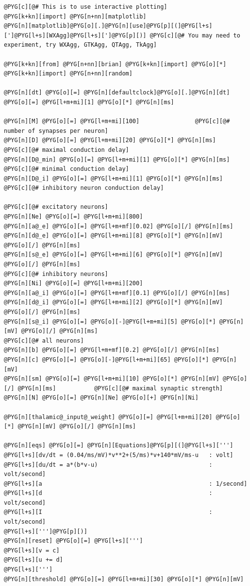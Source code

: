 \documentclass[letterpaper,10pt,english]{manual}
\begin{document}
\begin{Verbatim}[commandchars=@\[\]]
@PYG[c][@# This is to use interactive plotting]
@PYG[k+kn][import] @PYG[n+nn][matplotlib]
@PYG[n][matplotlib]@PYG[o][.]@PYG[n][use]@PYG[p][(]@PYG[l+s][']@PYG[l+s][WXAgg]@PYG[l+s][']@PYG[p][)] @PYG[c][@# You may need to experiment, try WXAgg, GTKAgg, QTAgg, TkAgg]

@PYG[k+kn][from] @PYG[n+nn][brian] @PYG[k+kn][import] @PYG[o][*]
@PYG[k+kn][import] @PYG[n+nn][random]

@PYG[n][dt] @PYG[o][=] @PYG[n][defaultclock]@PYG[o][.]@PYG[n][dt] @PYG[o][=] @PYG[l+m+mi][1] @PYG[o][*] @PYG[n][ms]

@PYG[n][M] @PYG[o][=] @PYG[l+m+mi][100]                @PYG[c][@# number of synapses per neuron]
@PYG[n][D] @PYG[o][=] @PYG[l+m+mi][20] @PYG[o][*] @PYG[n][ms]              @PYG[c][@# maximal conduction delay]
@PYG[n][D@_min] @PYG[o][=] @PYG[l+m+mi][1] @PYG[o][*] @PYG[n][ms]           @PYG[c][@# minimal conduction delay]
@PYG[n][D@_i] @PYG[o][=] @PYG[l+m+mi][1] @PYG[o][*] @PYG[n][ms]             @PYG[c][@# inhibitory neuron conduction delay]

@PYG[c][@# excitatory neurons]
@PYG[n][Ne] @PYG[o][=] @PYG[l+m+mi][800]
@PYG[n][a@_e] @PYG[o][=] @PYG[l+m+mf][0.02] @PYG[o][/] @PYG[n][ms]
@PYG[n][d@_e] @PYG[o][=] @PYG[l+m+mi][8] @PYG[o][*] @PYG[n][mV] @PYG[o][/] @PYG[n][ms]
@PYG[n][s@_e] @PYG[o][=] @PYG[l+m+mi][6] @PYG[o][*] @PYG[n][mV] @PYG[o][/] @PYG[n][ms]
@PYG[c][@# inhibitory neurons]
@PYG[n][Ni] @PYG[o][=] @PYG[l+m+mi][200]
@PYG[n][a@_i] @PYG[o][=] @PYG[l+m+mf][0.1] @PYG[o][/] @PYG[n][ms]
@PYG[n][d@_i] @PYG[o][=] @PYG[l+m+mi][2] @PYG[o][*] @PYG[n][mV] @PYG[o][/] @PYG[n][ms]
@PYG[n][s@_i] @PYG[o][=] @PYG[o][-]@PYG[l+m+mi][5] @PYG[o][*] @PYG[n][mV] @PYG[o][/] @PYG[n][ms]
@PYG[c][@# all neurons]
@PYG[n][b] @PYG[o][=] @PYG[l+m+mf][0.2] @PYG[o][/] @PYG[n][ms]
@PYG[n][c] @PYG[o][=] @PYG[o][-]@PYG[l+m+mi][65] @PYG[o][*] @PYG[n][mV]
@PYG[n][sm] @PYG[o][=] @PYG[l+m+mi][10] @PYG[o][*] @PYG[n][mV] @PYG[o][/] @PYG[n][ms]           @PYG[c][@# maximal synaptic strength]
@PYG[n][N] @PYG[o][=] @PYG[n][Ne] @PYG[o][+] @PYG[n][Ni]

@PYG[n][thalamic@_input@_weight] @PYG[o][=] @PYG[l+m+mi][20] @PYG[o][*] @PYG[n][mV] @PYG[o][/] @PYG[n][ms]

@PYG[n][eqs] @PYG[o][=] @PYG[n][Equations]@PYG[p][(]@PYG[l+s][''']
@PYG[l+s][dv/dt = (0.04/ms/mV)*v**2+(5/ms)*v+140*mV/ms-u   : volt]
@PYG[l+s][du/dt = a*(b*v-u)                                : volt/second]
@PYG[l+s][a                                                : 1/second]
@PYG[l+s][d                                                : volt/second]
@PYG[l+s][I                                                : volt/second]
@PYG[l+s][''']@PYG[p][)]
@PYG[n][reset] @PYG[o][=] @PYG[l+s][''']
@PYG[l+s][v = c]
@PYG[l+s][u += d]
@PYG[l+s][''']
@PYG[n][threshold] @PYG[o][=] @PYG[l+m+mi][30] @PYG[o][*] @PYG[n][mV]


\end{Verbatim}
\end{document}
